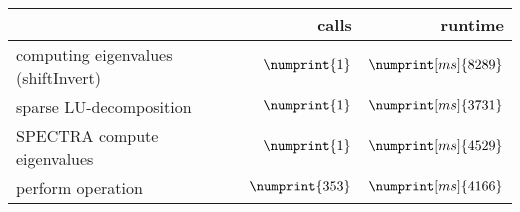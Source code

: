 \begin{tabular}{l|r|r}
	 & calls & runtime \\
\hline	\hspace{0mm}computing eigenvalues (shiftInvert) & $\numprint{1}$ & $\numprint[ms]{8289}$ \\
	\hspace{5mm}sparse LU-decomposition & $\numprint{1}$ & $\numprint[ms]{3731}$ \\
	\hspace{5mm}SPECTRA compute eigenvalues & $\numprint{1}$ & $\numprint[ms]{4529}$ \\
	\hspace{10mm}perform operation & $\numprint{353}$ & $\numprint[ms]{4166}$
\end{tabular}
